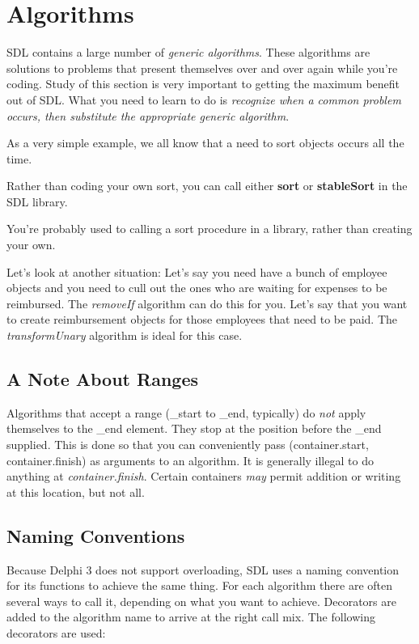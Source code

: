 \documentclass{report}
\begin{document}
\chapter{Algorithms}

SDL contains a large number of \emph{generic algorithms}. These algorithms
are solutions to problems that present themselves over and over again while
you're coding. Study of this section is very important to getting the
maximum benefit out of SDL. What you need to learn to do is \emph{recognize
when a common problem occurs, then substitute the appropriate generic algorithm}.

As a very simple example, we all know that a need to sort objects 
occurs all the time.

Rather than coding your own sort, you can call either 
\textbf{sort}
 or 
\textbf{stableSort}
 in the SDL library.

You're probably used to calling a sort procedure in a library, 
rather than creating your own.

Let's look at another situation: Let's say you need have a bunch of employee
objects and you need to cull out the ones who are waiting for expenses to be
reimbursed. The \emph{removeIf} algorithm can do this for you. Let's say
that you want to create reimbursement objects for those employees that need
to be paid. The \emph{transformUnary} algorithm is ideal for this case.

\section{A Note About Ranges}

 Algorithms that accept a range (\_start to \_end, typically) do \emph{not}
apply themselves to the \_end element. They stop at the position before the
\_end supplied. This is done so that you can conveniently pass
(container.start, container.finish) as arguments to an algorithm. It is
generally illegal to do anything at \emph{container.finish}. Certain
containers \emph{may} permit addition or writing at this location, but not
all.

\section{Naming Conventions}

Because Delphi 3 does not support overloading, SDL uses a naming convention
for its functions to achieve the same thing. For each algorithm there are
often several ways to call it, depending on what you want to achieve.
Decorators are added to the algorithm name to arrive at the right call mix.
The following decorators are used:
\end{document}
